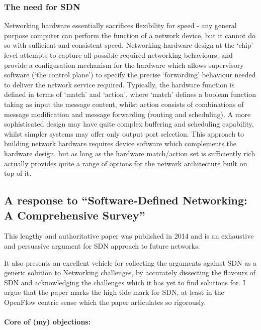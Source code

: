 \subsubsection{The need for SDN}
Networking hardware essentially sacrifices flexibility for speed - any general purpose computer can perform the function of a network device, but it cannot do so with sufficient and consistent speed.  Networking hardware design at the ‘chip’ level attempts to capture all possible required networking behaviours, and provide a configuration mechanism for the hardware which allows supervisory software (‘the control plane’) to specify the precise ‘forwarding’ behaviour needed to deliver the network service required.  Typically, the hardware function is defined in terms of ‘match’ and ‘action’, where ‘match’ defines a boolean function taking as input the message content, whilst action consists of combinations of message modification and message forwarding (routing and scheduling).  A more sophisticated design may have quite complex buffering and scheduling capability, whilst simpler systems may offer only output port selection.
This approach to building network hardware requires device software which complements the hardware design, but as long as the hardware match/action set is sufficiently rich actually provides quite a range of options for the network architecture built on top of it.


\subsection{A response to “Software-Defined Networking: A Comprehensive Survey”}

This lengthy and authoritative paper \cite{Kreutz2015} was published in 2014 and is an exhaustive and persuasive argument for SDN approach to future networks.

It also presents an excellent vehicle for collecting the arguments against SDN as a generic solution to Networking challenges, by accurately dissecting the flavours of SDN and acknowledging the challenges which it has yet to find solutions for.
I argue that the paper marks the high tide mark for SDN, at least in the OpenFlow centric sense which the paper articulates so rigorously.

\paragraph{Core of (my) objections:}

